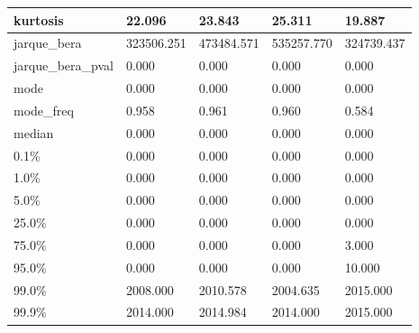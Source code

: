 \begin{table}[H]
\begin{tabular}{|l|m{10em}|m{10em}|m{10em}|m{10em}|}
\hline kurtosis & 22.096 & 23.843 & 25.311 & 19.887 \\
\hline jarque\_bera & 323506.251 & 473484.571 & 535257.770 & 324739.437 \\
\hline jarque\_bera\_pval & 0.000 & 0.000 & 0.000 & 0.000 \\
\hline mode & 0.000 & 0.000 & 0.000 & 0.000 \\
\hline mode\_freq & 0.958 & 0.961 & 0.960 & 0.584 \\
\hline median & 0.000 & 0.000 & 0.000 & 0.000 \\
\hline 0.1\% & 0.000 & 0.000 & 0.000 & 0.000 \\
\hline 1.0\% & 0.000 & 0.000 & 0.000 & 0.000 \\
\hline 5.0\% & 0.000 & 0.000 & 0.000 & 0.000 \\
\hline 25.0\% & 0.000 & 0.000 & 0.000 & 0.000 \\
\hline 75.0\% & 0.000 & 0.000 & 0.000 & 3.000 \\
\hline 95.0\% & 0.000 & 0.000 & 0.000 & 10.000 \\
\hline 99.0\% & 2008.000 & 2010.578 & 2004.635 & 2015.000 \\
\hline 99.9\% & 2014.000 & 2014.984 & 2014.000 & 2015.000 \\
\hline
\end{tabular}
\end{table}
